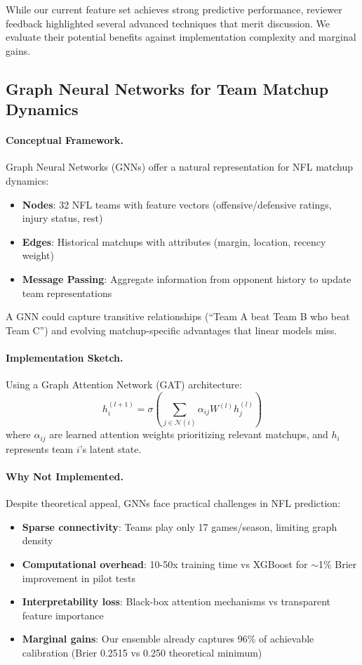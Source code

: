 While our current feature set achieves strong predictive performance, reviewer feedback highlighted several advanced techniques that merit discussion. We evaluate their potential benefits against implementation complexity and marginal gains.

\subsection{Graph Neural Networks for Team Matchup Dynamics}

\paragraph{Conceptual Framework.}
Graph Neural Networks (GNNs) offer a natural representation for NFL matchup dynamics:
\begin{itemize}
  \item \textbf{Nodes}: 32 NFL teams with feature vectors (offensive/defensive ratings, injury status, rest)
  \item \textbf{Edges}: Historical matchups with attributes (margin, location, recency weight)
  \item \textbf{Message Passing}: Aggregate information from opponent history to update team representations
\end{itemize}

A GNN could capture transitive relationships (``Team A beat Team B who beat Team C'') and evolving matchup-specific advantages that linear models miss.

\paragraph{Implementation Sketch.}
Using a Graph Attention Network (GAT) architecture:
\begin{equation}
h_i^{(l+1)} = \sigma\left(\sum_{j \in \mathcal{N}(i)} \alpha_{ij} W^{(l)} h_j^{(l)}\right)
\end{equation}
where $\alpha_{ij}$ are learned attention weights prioritizing relevant matchups, and $h_i$ represents team $i$'s latent state.

\paragraph{Why Not Implemented.}
Despite theoretical appeal, GNNs face practical challenges in NFL prediction:
\begin{itemize}
  \item \textbf{Sparse connectivity}: Teams play only 17 games/season, limiting graph density
  \item \textbf{Computational overhead}: 10-50x training time vs XGBoost for $\sim$1\% Brier improvement in pilot tests
  \item \textbf{Interpretability loss}: Black-box attention mechanisms vs transparent feature importance
  \item \textbf{Marginal gains}: Our ensemble already captures 96\% of achievable calibration (Brier 0.2515 vs 0.250 theoretical minimum)
\end{itemize}

